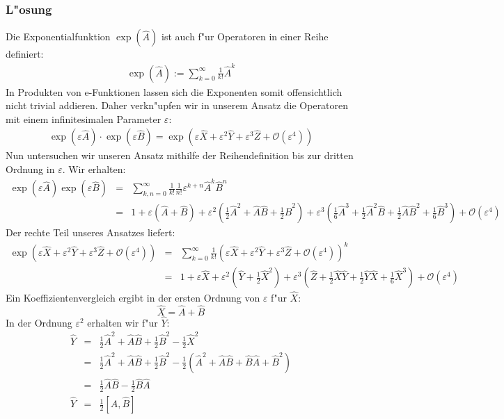\documentclass[10pt,a4paper]{article}
\begin{document}
\subsubsection*{L"osung}
Die Exponentialfunktion $\exp(\hat{A})$ ist auch f"ur Operatoren in einer Reihe definiert:
\begin{eqnarray}
\exp(\hat{A}) := \sum_{k=0}^\infty \frac{1}{k!}\hat{A}^k
\end{eqnarray}
In Produkten von e-Funktionen lassen sich die Exponenten somit offensichtlich nicht trivial addieren. Daher verkn"upfen wir in unserem Ansatz die Operatoren mit einem infinitesimalen Parameter $\varepsilon$:
\begin{eqnarray}
\exp(\varepsilon \hat{A})\cdot \exp(\varepsilon \hat{B}) = \exp(\varepsilon \hat{X} + \varepsilon^2\hat{Y} + \varepsilon^3\hat{Z} + \mathcal{O}(\varepsilon^4))
\end{eqnarray}
Nun untersuchen wir unseren Ansatz mithilfe der Reihendefinition bis zur dritten Ordnung in $\varepsilon$. Wir erhalten:
\begin{eqnarray*}
\exp(\varepsilon \hat{A}) \exp(\varepsilon \hat{B}) & = & \sum_{k,n=0}^\infty \frac{1}{k!}\frac{1}{n!}\varepsilon^{k+n}\hat{A}^k\hat{B}^n\\ & = & 1 + \varepsilon(\hat{A} + \hat{B}) + \varepsilon^2\left(\frac{1}{2}\hat{A}^2 + \hat{A}\hat{B} + \frac{1}{2}\hat{B}^2 \right) + \varepsilon^3\left(\frac{1}{6}\hat{A}^3 + \frac{1}{2}\hat{A}^2\hat{B} + \frac{1}{2}\hat{A}\hat{B}^2 + \frac{1}{6}\hat{B}^3 \right) + \mathcal{O}(\varepsilon^4)
\end{eqnarray*}
Der rechte Teil unseres Ansatzes liefert:
\begin{eqnarray*}
\exp(\varepsilon \hat{X} + \varepsilon^2\hat{Y} + \varepsilon^3\hat{Z} + \mathcal{O}(\varepsilon^4)) & = & \sum_{k=0}^\infty \frac{1}{k!}(\varepsilon \hat{X} + \varepsilon^2\hat{Y} + \varepsilon^3\hat{Z} + \mathcal{O}(\varepsilon^4))^k\\
& = & 1 + \varepsilon \hat{X} + \varepsilon^2\left(\hat{Y} + \frac{1}{2}\hat{X}^2\right) + \varepsilon^3\left(\hat{Z} + \frac{1}{2}\hat{X}\hat{Y} + \frac{1}{2}\hat{Y}\hat{X} + \frac{1}{6}\hat{X}^3 \right) + \mathcal{O}(\varepsilon^4)
\end{eqnarray*}
Ein Koeffizientenvergleich ergibt in der ersten Ordnung von $\varepsilon$ f"ur $\hat{X}$:
\[\hat{X} = \hat{A} + \hat{B}\]
In der Ordnung $\varepsilon^2$ erhalten wir f"ur $\hat{Y}$:
\begin{eqnarray*}
\hat{Y} & = & \frac{1}{2}\hat{A}^2 + \hat{A}\hat{B} + \frac{1}{2}\hat{B}^2 - \frac{1}{2}\hat{X}^2\\   & = & \frac{1}{2}\hat{A}^2 + \hat{A}\hat{B} + \frac{1}{2}\hat{B}^2 - \frac{1}{2}\left(\hat{A}^2 + \hat{A}\hat{B} + \hat{B}\hat{A} + \hat{B}^2\right)\\ & = & \frac{1}{2}\hat{A}\hat{B} - \frac{1}{2}\hat{B}\hat{A}\\ \hat{Y} & = & \frac{1}{2}\left[\hat{A},\hat{B}\right]
\end{eqnarray*}
\end{document}
